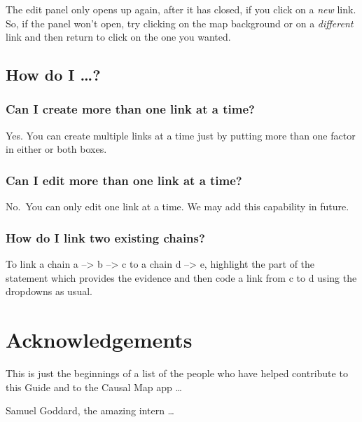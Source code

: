 \documentclass[
]{book}
\begin{document}
The edit panel only opens up again, after it has closed, if you click on a \emph{new} link. So, if the panel won't open, try clicking on the map background or on a \emph{different} link and then return to click on the one you wanted.

\hypertarget{how-do-i}{%
\section{How do I \ldots?}\label{how-do-i}}

\hypertarget{can-i-create-more-than-one-link-at-a-time}{%
\subsection{Can I create more than one link at a time?}\label{can-i-create-more-than-one-link-at-a-time}}

Yes. You can create multiple links at a time just by putting more than one factor in either or both boxes.

\hypertarget{can-i-edit-more-than-one-link-at-a-time}{%
\subsection{Can I edit more than one link at a time?}\label{can-i-edit-more-than-one-link-at-a-time}}

No.~You can only edit one link at a time. We may add this capability in future.

\hypertarget{how-do-i-link-two-existing-chains}{%
\subsection{How do I link two existing chains?}\label{how-do-i-link-two-existing-chains}}

To link a chain a --\textgreater{} b --\textgreater{} c to a chain d --\textgreater{} e, highlight the part of the statement which provides the evidence and then code a link from c to d using the dropdowns as usual.

\hypertarget{acknowledgements}{%
\chapter{Acknowledgements}\label{acknowledgements}}

This is just the beginnings of a list of the people who have helped contribute to this Guide and to the Causal Map app \ldots{}

Samuel Goddard, the amazing intern \ldots{}
\end{document}

